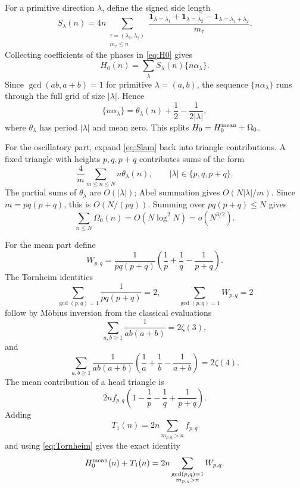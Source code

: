 \documentclass[a4paper,american,11pt]{amsart}
\theoremstyle{plain}
\theoremstyle{definition}
\newcommand{\ind}{\mathbf 1}
\begin{document}
For a primitive direction \(\lambda\), define the signed side length
\begin{equation}\label{eq:Slam}
 S_\lambda(n)=4n\sum_{\substack{\tau=(\lambda_1,\lambda_2)\\m_\tau\le n}}
 \frac{\ind_{\lambda=\lambda_1}+\ind_{\lambda=\lambda_2}-\ind_{\lambda=\lambda_1+\lambda_2}}{m_\tau}.
\end{equation}
Collecting coefficients of the phases in \eqref{eq:H0} gives
\begin{equation}\label{eq:H0Slam}
 H_0(n)=\sum_\lambda S_\lambda(n)\{n\alpha_\lambda\}.
\end{equation}
Since \(\gcd(ab,a+b)=1\) for primitive \(\lambda=(a,b)\), the sequence
\(\{n\alpha_\lambda\}\) runs through the full grid of size \(|\lambda|\).
Hence
\begin{equation}\label{eq:thetaSplit}
 \{n\alpha_\lambda\}=\theta_\lambda(n)+\frac12-\frac{1}{2|\lambda|},
\end{equation}
where \(\theta_\lambda\) has period \(|\lambda|\) and mean zero.  This splits
\(H_0=H_0^{\rm mean}+\Omega_0\).

For the oscillatory part, expand \eqref{eq:Slam} back into triangle
contributions.  A fixed triangle with heights \(p,q,p+q\) contributes sums of
the form
\[
 \frac4m\sum_{m\le n\le N}n\theta_\lambda(n),
 \qquad
 |\lambda|\in\{p,q,p+q\}.
\]
The partial sums of \(\theta_\lambda\) are \(O(|\lambda|)\); Abel summation
gives \(O(N|\lambda|/m)\).  Since \(m=pq(p+q)\), this is \(O(N/(pq))\).
Summing over \(pq(p+q)\le N\) gives
\[
 \sum_{n\le N}\Omega_0(n)=O(N\log^2N)=o(N^{3/2}).
\]

For the mean part define
\begin{equation}\label{eq:Wpq}
 W_{p,q}=\frac{1}{pq(p+q)}\left(\frac1p+\frac1q-\frac{1}{p+q}\right).
\end{equation}
The Tornheim identities
\begin{equation}\label{eq:Tornheim}
 \sum_{\gcd(p,q)=1}\frac{1}{pq(p+q)}=2,
 \qquad
 \sum_{\gcd(p,q)=1}W_{p,q}=2
\end{equation}
follow by M\"obius inversion from the classical evaluations
\[
 \sum_{a,b\ge1}\frac1{ab(a+b)}=2\zeta(3),
\]
and
\[
 \sum_{a,b\ge1}\frac1{ab(a+b)}\left(\frac1a+\frac1b-\frac1{a+b}\right)=2\zeta(4).
\]
The mean contribution of a head triangle is
\[
 2nf_{p,q}\left(1-\frac1p-\frac1q+\frac1{p+q}\right).
\]
Adding
\[
 T_1(n)=2n\sum_{m_{p,q}>n}f_{p,q}
\]
and using \eqref{eq:Tornheim} gives the exact identity
\begin{equation}\label{eq:weightedTailId}
 H_0^{\rm mean}(n)+T_1(n)
 =2n\sum_{\substack{\gcd(p,q)=1\\m_{p,q}>n}}W_{p,q}.
\end{equation}
\end{document}
